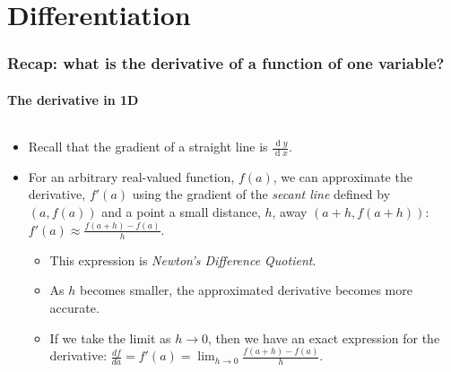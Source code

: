 \documentclass[\beamerclass]{beamer}
\newcommand{\dif}[1]{\ensuremath{\operatorname{d}\!{#1}}}
\begin{document}
\section{Differentiation}
\begin{frame}
\frametitle{Recap: what is the derivative of a function of one variable?}
\framesubtitle{The derivative in 1D}
\begin{columns}
\begin{column}{0.65\textwidth}
\begin{itemize}
	\setlength\itemsep{2mm}
	\item<1-> Recall that the gradient of a straight line is $\frac{\dif y}{\dif  x}$.
	\item<2-> For an arbitrary real-valued function, $f(a)$, we can approximate the derivative, $f'(a)$ using the gradient of the \emph{secant line} defined by $(a,f(a))$ and a point a small distance, $h$, away $(a+h,f(a+h))$: $f'(a) \approx \frac{f(a+h) - f(a)}{h}$.
	\begin{itemize}
		\setlength\itemsep{2mm}
		\item<3-> This expression is \textit{Newton's Difference Quotient}.
		\item<4-> As $h$ becomes smaller, the approximated derivative becomes more accurate. 
		\item<5-> If we take the limit as $h \to 0$, then we have an exact expression for the derivative: $\frac{df}{da} = f'(a) = \lim_{h\to0} \frac{f(a+h) - f(a)}{h}$.
	\end{itemize}
\end{itemize}
\end{column}
\begin{column}{0.35\textwidth}


\end{column}
\end{columns}
\end{frame}
\end{document}
